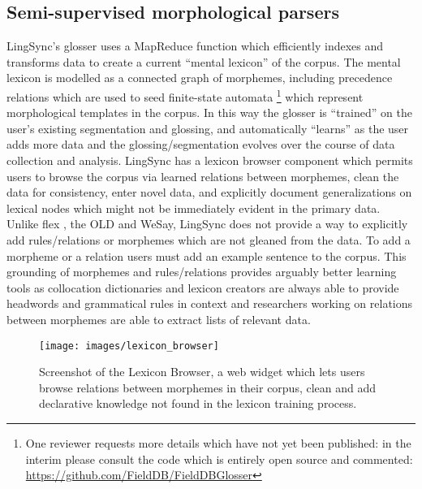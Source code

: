 \documentclass[11pt]{article}
\begin{document}
\subsection{Semi-supervised morphological parsers}
 \label{sec:lingsync-glosser} 

LingSync's glosser uses a MapReduce function which efficiently indexes and transforms data 
 to create a current ``mental lexicon'' of the corpus.  The
mental lexicon is modelled as a connected graph of morphemes, including
precedence relations which are used to seed finite-state automata \cite{Chiodo:2009}%
\footnote{One reviewer requests more details which have not yet been published:
    in the interim please consult the code which is entirely open source and
    commented:  \\
\url{https://github.com/FieldDB/FieldDBGlosser}} %
which represent morphological templates in the corpus. In this way the glosser
is ``trained'' on the user's existing segmentation and glossing, and
automatically ``learns'' as the user adds more data and the
glossing/segmentation evolves over the course of data collection and analysis. 
LingSync has a lexicon browser component which permits users to browse the
corpus via learned  relations between morphemes, clean the data for
consistency, enter novel data, and explicitly document generalizations on
lexical nodes which might not be immediately evident in the primary data. 
Unlike \gls{flex} \cite{Black:2006}, the OLD and WeSay, LingSync does not
provide a way to explicitly add rules/relations or morphemes which are not
gleaned from the data. To add a morpheme or a relation users must add an
example sentence to the corpus. This grounding of morphemes and rules/relations
provides arguably better learning tools as collocation dictionaries and
lexicon creators are always able to provide headwords and grammatical rules in
context and researchers working on relations between morphemes are able to
extract lists of relevant data.

\begin{figure}
\begin{center}
\texttt{[image: images/lexicon\_browser]}
\caption{Screenshot of the Lexicon Browser, a web widget which lets users
browse relations between morphemes in their corpus, clean and add
declarative knowledge not found in the lexicon training process.}
\label{lexicon_browser_screenshot}
\end{center}
\end{figure}
\end{document}
